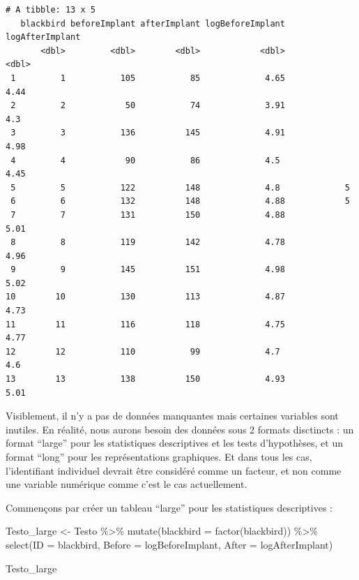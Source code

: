 \documentclass[
  a4paper,
]{article}
\newenvironment{Shaded}{\begin{snugshade}}{\end{snugshade}}
\newcommand{\AttributeTok}[1]{\textcolor[rgb]{0.00,0.34,0.68}{#1}}
\newcommand{\FunctionTok}[1]{\textcolor[rgb]{0.39,0.29,0.61}{#1}}
\newcommand{\NormalTok}[1]{\textcolor[rgb]{0.12,0.11,0.11}{#1}}
\newcommand{\OtherTok}[1]{\textcolor[rgb]{0.00,0.43,0.16}{#1}}
\newcommand{\SpecialCharTok}[1]{\textcolor[rgb]{0.24,0.68,0.91}{#1}}
\begin{document}
\begin{verbatim}
# A tibble: 13 x 5
   blackbird beforeImplant afterImplant logBeforeImplant logAfterImplant
       <dbl>         <dbl>        <dbl>            <dbl>           <dbl>
 1         1           105           85             4.65            4.44
 2         2            50           74             3.91            4.3 
 3         3           136          145             4.91            4.98
 4         4            90           86             4.5             4.45
 5         5           122          148             4.8             5   
 6         6           132          148             4.88            5   
 7         7           131          150             4.88            5.01
 8         8           119          142             4.78            4.96
 9         9           145          151             4.98            5.02
10        10           130          113             4.87            4.73
11        11           116          118             4.75            4.77
12        12           110           99             4.7             4.6 
13        13           138          150             4.93            5.01
\end{verbatim}

Visiblement, il n'y a pas de données manquantes mais certaines variables sont inutiles. En réalité, nous aurons besoin des données sous 2 formats disctincts : un format ``large'' pour les statistiques descriptives et les tests d'hypothèses, et un format ``long'' pour les représentations graphiques. Et dans tous les cas, l'identifiant individuel devrait être considéré comme un facteur, et non comme une variable numérique comme c'est le cas actuellement.

Commençons par créer un tableau ``large'' pour les statistiques descriptives :

\begin{Shaded}
\begin{Highlighting}[]
\NormalTok{Testo\_large }\OtherTok{\textless{}{-}}\NormalTok{ Testo }\SpecialCharTok{\%\textgreater{}\%} 
  \FunctionTok{mutate}\NormalTok{(}\AttributeTok{blackbird =} \FunctionTok{factor}\NormalTok{(blackbird)) }\SpecialCharTok{\%\textgreater{}\%}
  \FunctionTok{select}\NormalTok{(}\AttributeTok{ID =}\NormalTok{ blackbird,}
         \AttributeTok{Before =}\NormalTok{ logBeforeImplant,}
         \AttributeTok{After =}\NormalTok{ logAfterImplant)}

\NormalTok{Testo\_large}
\end{Highlighting}
\end{Shaded}
\end{document}
